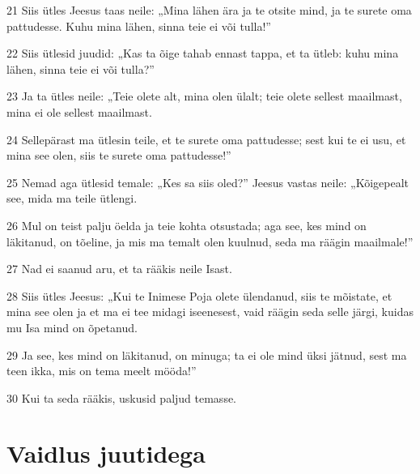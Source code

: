\par 21 Siis ütles Jeesus taas neile: „Mina lähen ära ja te otsite mind, ja te surete oma pattudesse. Kuhu mina lähen, sinna teie ei või tulla!”
\par 22 Siis ütlesid juudid: „Kas ta õige tahab ennast tappa, et ta ütleb: kuhu mina lähen, sinna teie ei või tulla?”
\par 23 Ja ta ütles neile: „Teie olete alt, mina olen ülalt; teie olete sellest maailmast, mina ei ole sellest maailmast.
\par 24 Sellepärast ma ütlesin teile, et te surete oma pattudesse; sest kui te ei usu, et mina see olen, siis te surete oma pattudesse!”
\par 25 Nemad aga ütlesid temale: „Kes sa siis oled?” Jeesus vastas neile: „Kõigepealt see, mida ma teile ütlengi.
\par 26 Mul on teist palju öelda ja teie kohta otsustada; aga see, kes mind on läkitanud, on tõeline, ja mis ma temalt olen kuulnud, seda ma räägin maailmale!”
\par 27 Nad ei saanud aru, et ta rääkis neile Isast.
\par 28 Siis ütles Jeesus: „Kui te Inimese Poja olete ülendanud, siis te mõistate, et mina see olen ja et ma ei tee midagi iseenesest, vaid räägin seda selle järgi, kuidas mu Isa mind on õpetanud.
\par 29 Ja see, kes mind on läkitanud, on minuga; ta ei ole mind üksi jätnud, sest ma teen ikka, mis on tema meelt mööda!”
\par 30 Kui ta seda rääkis, uskusid paljud temasse.

\section*{Vaidlus juutidega}

